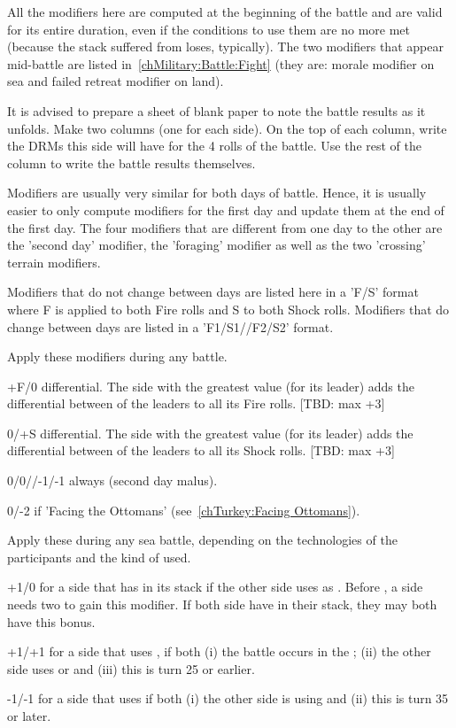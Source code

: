 All the modifiers here are computed at the beginning of the battle and are
valid for its entire duration, even if the conditions to use them are no more
met (because the stack suffered from loses, typically). The two modifiers that
appear mid-battle are listed in~\ref{chMilitary:Battle:Fight} (they are:
morale modifier on sea and failed retreat modifier on land).

\begin{playtip}
  It is advised to prepare a sheet of blank paper to note the battle results
  as it unfolds. Make two columns (one for each side). On the top of each
  column, write the DRMs this side will have for the 4 rolls of the
  battle. Use the rest of the column to write the battle results themselves.

  Modifiers are usually very similar for both days of battle. Hence, it is
  usually easier to only compute modifiers for the first day and update them
  at the end of the first day. The four modifiers that are different from one
  day to the other are the 'second day' modifier, the 'foraging' modifier as
  well as the two 'crossing' terrain modifiers.
\end{playtip}

Modifiers that do not change between days are listed here in a 'F/S' format
where F is applied to both Fire rolls and S to both Shock rolls. Modifiers
that do change between days are listed in a 'F1/S1//F2/S2' format.

 Apply these modifiers during any battle.
\begin{modlist}
\item[+F/0] \Fire differential. The side with the greatest \Fire value (for its
  leader) adds the differential between \Fire of the leaders to all its Fire
  rolls. [TBD: max +3]
\item[0/+S] \Shock differential. The side with the greatest \Shock value (for
  its leader) adds the differential between \Shock of the leaders to all its
  Shock rolls. [TBD: max +3]
\item[0/0//-1/-1] always (second day malus).
\item[0/-2] if 'Facing the Ottomans' (see~\ref{chTurkey:Facing Ottomans}).
\end{modlist}

 Apply these during any sea battle,
depending on the technologies of the participants and the kind of  used.
\begin{modlist}
\item[+1/0] for a side that has \VGD in its stack if the other side uses \NGD
  as . Before \TBAT, a side needs two \VGD to gain
  this modifier. If both side have \VGD in their stack, they may both have
  this bonus.
\item[+1/+1] for a side that uses \NGD, if both (i) the battle occurs in the
  ; (ii) the other side uses \NWD or \NTD and (iii) this
  is turn 25 or earlier.
\item[-1/-1] for a side that uses \NGD if both (i) the other side is using
  \NWD and (ii) this is turn 35 or later.
\end{modlist}


